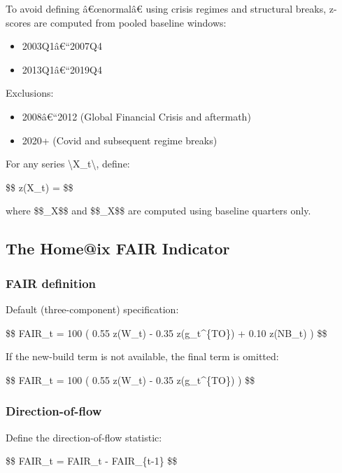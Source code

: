 To avoid defining â€œnormalâ€ using crisis regimes and structural
breaks, z-scores are computed from pooled baseline windows:

\begin{itemize}
\tightlist
\item
  2003Q1â€``2007Q4
\item
  2013Q1â€``2019Q4
\end{itemize}

Exclusions:

\begin{itemize}
\tightlist
\item
  2008â€``2012 (Global Financial Crisis and aftermath)
\item
  2020+ (Covid and subsequent regime breaks)
\end{itemize}

For any series \textbackslash X\_t\textbackslash, define:

\$\$ z(X\_t) =  \$\$

where \$\$\mu\_X\$\$ and \$\$\sigma\_X\$\$ are computed using baseline
quarters only.

\subsection{The Home@ix FAIR Indicator}\label{the-homeix-fair-indicator}

\subsubsection{FAIR definition}\label{fair-definition-1}

Default (three-component) specification:

\$\$ FAIR\_t = 100 \cdot \Big( 0.55 \cdot z(W\_t) - 0.35
\cdot z(g\_t\^{}\{TO\}) + 0.10 \cdot z(\Delta NB\_t) \Big) \$\$

If the new-build term is not available, the final term is omitted:

\$\$ FAIR\_t = 100 \cdot \Big( 0.55 \cdot z(W\_t) - 0.35
\cdot z(g\_t\^{}\{TO\}) \Big) \$\$

\subsubsection{Direction-of-flow}\label{direction-of-flow-1}

Define the direction-of-flow statistic:

\$\$ \Delta FAIR\_t = FAIR\_t - FAIR\_\{t-1\} \$\$

